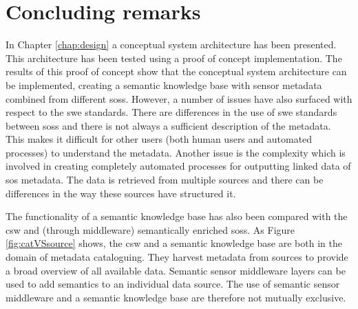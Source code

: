 
\section{Concluding remarks}
In Chapter \ref{chap:design} a conceptual system architecture has been presented. This architecture has been tested using a proof of concept implementation. The results of this proof of concept show that the conceptual system architecture can be implemented, creating a semantic knowledge base with sensor metadata combined from different \aclp{sos}. However, a number of issues have also surfaced with respect to the \ac{swe} standards. There are differences in the use of \ac{swe} standards between \aclp{sos} and there is not always a sufficient description of the metadata. This makes it difficult for other users (both human users and automated processes) to understand the metadata. Another issue is the complexity which is involved in creating completely automated processes for outputting linked data of \ac{sos} metadata. The data is retrieved from multiple sources and there can be differences in the way these sources have structured it. 

The functionality of a semantic knowledge base has also been compared with the \ac{csw} and (through middleware) semantically enriched \aclp{sos}. As Figure \ref{fig:catVSsource} shows, the \ac{csw} and a semantic knowledge base are both in the domain of metadata cataloguing. They harvest metadata from sources to provide a broad overview of all available data. Semantic sensor middleware layers can be used to add semantics to an individual data source. The use of semantic sensor middleware and a semantic knowledge base are therefore not mutually exclusive. 
   
